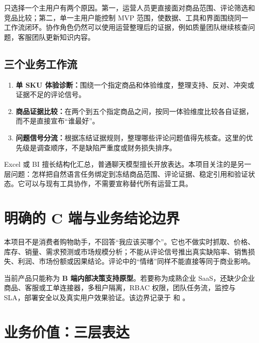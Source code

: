 只选择一个主用户有两个原因。第一，运营人员更直接面对商品范围、评论筛选和竞品比较；第二，单一主用户能控制 MVP 范围，使数据、工具和界面围绕同一工作流闭环。协作角色仍然可以使用运营整理后的证据，例如质量团队继续核查问题，客服团队更新知识内容。

\subsection{三个业务工作流}

\begin{enumerate}
  \item \textbf{单 SKU 体验诊断：}围绕一个指定商品和体验维度，整理支持、反对、冲突或证据不足的评论信号。
  \item \textbf{商品证据比较：}在两个到五个指定商品之间，按同一体验维度比较各自证据，而不是直接宣布“谁最好”。
  \item \textbf{问题信号分流：}根据冻结证据规则，整理哪些评论问题值得先核查。这里的优先级是调查顺序，不是缺陷严重度或财务损失排序。
\end{enumerate}

\begin{beginnerbox}
Excel 或 BI 擅长结构化汇总，普通聊天模型擅长开放表达。本项目关注的是另一层问题：怎样把自然语言任务绑定到冻结商品范围、评论证据、稳定引用和验证状态。它可以与现有工具协作，不需要宣称替代所有运营工具。
\end{beginnerbox}

\section{明确的 C 端与业务结论边界}

\begin{boundarybox}
本项目不是消费者购物助手，不回答“我应该买哪个”。它也不做实时抓取、价格、库存、销量、需求预测或市场规模分析；不能从评论信号推出真实缺陷率、销售损失、利润、市场份额或因果结论。评论中的“情绪”同样不能直接等同于商业影响。
\end{boundarybox}

当前产品只能称为 \textbf{B 端内部决策支持原型}。若要称为成熟企业 SaaS，还缺少企业商品、客服或工单连接器，多租户隔离，RBAC 权限，团队任务流，监控与 SLA，部署安全以及真实用户效果验证。该边界记录于  和 。

\section{业务价值：三层表达}

